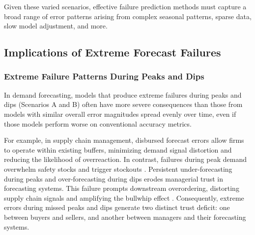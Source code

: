 \documentclass[]{interact}
\theoremstyle{definition}
\begin{document}
Given these varied scenarios, effective failure prediction methods must capture a broad range of error patterns arising from complex seasonal patterns, sparse data, slow model adjustment, and more.


%

\subsection{Implications of Extreme Forecast Failures}

\subsubsection{Extreme Failure Patterns During Peaks and Dips}

In demand forecasting, models that produce extreme failures during peaks and dips (Scenarios A and B) often have more severe consequences than those from models with similar overall error magnitudes spread evenly over time, even if those models perform worse on conventional accuracy metrics. 

For example, in supply chain management, disbursed forecast errors allow firms to operate within existing buffers, minimizing demand signal distortion and reducing the likelihood of overreaction. In contrast, failures during peak demand overwhelm safety stocks and trigger stockouts \citep{bray2019}. Persistent under-forecasting during peaks and over-forecasting during dips erodes managerial trust in forecasting systems. This failure prompts downstream overordering, distorting supply chain signals and amplifying the bullwhip effect \citep{croson2014, wu2006}. Consequently, extreme errors during missed peaks and dips generate two distinct trust deficit: one between buyers and sellers, and another between managers and their forecasting systems.

\end{document}
